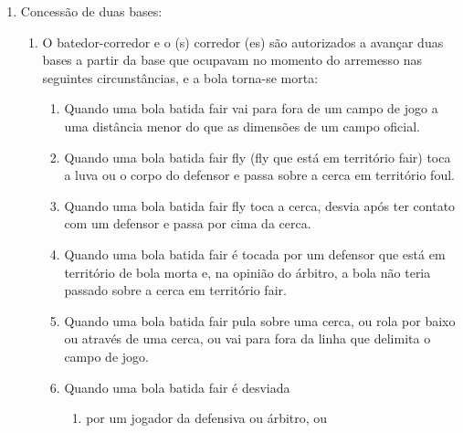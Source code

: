 \begin{multicols}{2}
\begin{enumerate}[label=\alph*)]
\begin{enumerate}[label=\roman*.]
\begin{enumerate}[label=\arabic*)]
			Se uma bola arremessada escapa do receptor, e este a recupera com equipamento fora do lugar apropriado quando nenhum corredor est\'a avan\c{c}ando, nenhuma poss\'ivel jogada \'e evidente, ou n\~ao ocasiona qualquer vantagem, n\~ao deve ser concedida uma base a nenhum corredor; a bola permanece viva, e o batedor pode avan\c{c}ar \`a primeira base somente quando obt\'em base por \glspl{ball} (\gls{baseonballs}), ou quando \'e aplicada a Regra do Terceiro \gls{strike}; ele pode avan\c{c}ar al\'em da primeira base a seu pr\'oprio risco. 
		\end{enumerate}
	\end{enumerate}
	\item  Concess\~ao de duas bases: 
	\begin{enumerate}[label=\roman* -]
		\item O batedor-corredor e o (s) corredor (es) s\~ao autorizados a avan\c{c}ar duas bases a partir da base que ocupavam no momento do arremesso nas seguintes circunst\^ancias, e a bola torna-se morta: 
		\begin{enumerate}[label=\arabic*)]
			\item Quando uma bola batida \gls{fair} vai para fora de um campo de jogo a uma dist\^ancia menor do que as dimens\~oes de um campo oficial. 
			\item Quando uma bola batida \gls{fair fly} (\gls{fly} que est\'a em territ\'orio \gls{fair}) toca a luva ou o corpo do defensor e passa sobre a cerca em territ\'orio \gls{foul}. 
			\item Quando uma bola batida \gls{fair fly} toca a cerca, desvia ap\'os ter contato com um defensor e passa por cima da cerca. 
			\item Quando uma bola batida \gls{fair} \'e tocada por um defensor que est\'a em territ\'orio de bola morta e, na opini\~ao do \'arbitro, a bola n\~ao teria passado sobre a cerca em territ\'orio \gls{fair}. 
			\item Quando uma bola batida \gls{fair} pula sobre uma cerca, ou rola por baixo ou atrav\'es de uma cerca, ou vai para fora da linha que delimita o campo de jogo. 
			\item Quando uma bola batida \gls{fair} \'e desviada 
			
			
			\begin{enumerate}[label=\alph*)]
				\item por um jogador da defensiva ou \'arbitro, ou 
				

\end{enumerate}
\end{enumerate}
\end{enumerate}
\end{enumerate}
\end{multicols}
